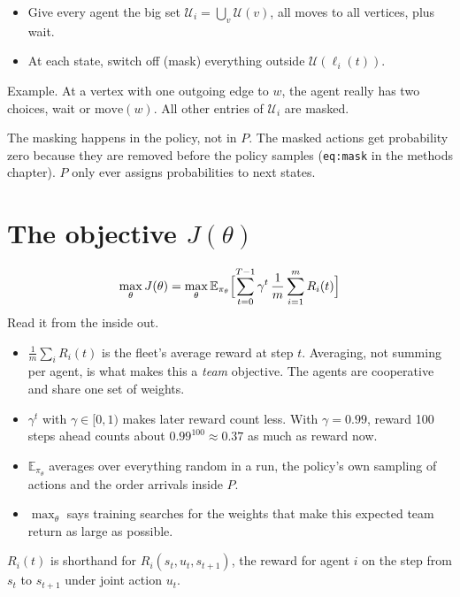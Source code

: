 \documentclass[11pt,a4paper]{article}
\begin{document}
\begin{itemize}[leftmargin=*]
  \item Give every agent the big set $\mathcal{U}_i = \bigcup_v \mathcal{U}(v)$,
        all moves to all vertices, plus wait.
  \item At each state, switch off (mask) everything outside
        $\mathcal{U}(\ell_i(t))$.
\end{itemize}

\noindent Example. At a vertex with one outgoing edge to $w$, the agent
really has two choices, wait or $\mathrm{move}(w)$. All other entries
of $\mathcal{U}_i$ are masked.

\noindent The masking happens in the policy, not in $P$. The masked
actions get probability zero because they are removed before the policy
samples (\texttt{eq:mask} in the methods chapter). $P$ only ever assigns
probabilities to next states.

\section{The objective \texorpdfstring{$J(\theta)$}{J(theta)}}

\[
  \max_{\theta} J(\theta)
    = \max_{\theta} \mathbb{E}_{\pi_\theta}
      \Bigl[ \sum_{t=0}^{T-1} \gamma^{t}\, \frac{1}{m} \sum_{i=1}^{m} R_i(t) \Bigr]
\]
Read it from the inside out.
\begin{itemize}[leftmargin=*]
  \item $\frac{1}{m}\sum_i R_i(t)$ is the fleet's average reward at step
        $t$. Averaging, not summing per agent, is what makes this a
        \emph{team} objective. The agents are cooperative and share one
        set of weights.
  \item $\gamma^t$ with $\gamma \in [0,1)$ makes later reward count less.
        With $\gamma=0.99$, reward 100 steps ahead counts about
        $0.99^{100}\approx 0.37$ as much as reward now.
  \item $\mathbb{E}_{\pi_\theta}$ averages over everything random in a
        run, the policy's own sampling of actions and the order arrivals
        inside $P$.
  \item $\max_\theta$ says training searches for the weights that make
        this expected team return as large as possible.
\end{itemize}

\noindent $R_i(t)$ is shorthand for $R_i(s_t, u_t, s_{t+1})$, the reward
for agent $i$ on the step from $s_t$ to $s_{t+1}$ under joint action $u_t$.
\end{document}
